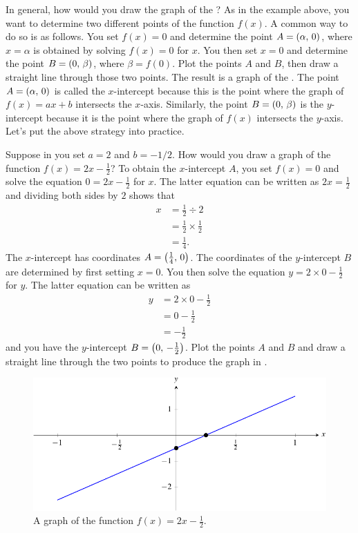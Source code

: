 \documentclass[a4paper,oneside,12pt]{article}
\begin{document}
In general, how would you draw the graph of the
?  As in the example above, you
want to determine two different points of the function $f(x)$.  A
common way to do so is as follows.  You set $f(x) = 0$ and determine
the point $A = \left\lparen{\alpha},\, {0}\right\rparen$, where $x = \alpha$ is obtained by
solving $f(x) = 0$ for $x$.  You then set $x = 0$ and determine the
point $B = \left\lparen{0},\, {\beta}\right\rparen$, where $\beta = f(0)$.  Plot the points
$A$ and $B$, then draw a straight line through those two points.  The
result is a graph of the .  The
point $A = \left\lparen{\alpha},\, {0}\right\rparen$ is called the $x$-intercept because this
is the point where the graph of $f(x) = ax + b$ intersects the
$x$-axis.  Similarly, the point $B = \left\lparen{0},\, {\beta}\right\rparen$ is the
$y$-intercept because it is the point where the graph of $f(x)$
intersects the $y$-axis.  Let's put the above strategy into practice.

Suppose in  you set $a = 2$ and
$b = -1 / 2$.  How would you draw a graph of the function
$f(x) = 2x - \frac{1}{2}$?  To obtain the $x$-intercept $A$, you set
$f(x) = 0$ and solve the equation $0 = 2x - \frac{1}{2}$ for $x$.  The
latter equation can be written as $2x = \frac{1}{2}$ and dividing both
sides by $2$ shows that
\begin{align*}
x
&=
\frac{1}{2} \div 2 \\[4pt]
&=
\frac{1}{2} \times \frac{1}{2} \\[4pt]
&=
\frac{1}{4}.
\end{align*}
The $x$-intercept has coordinates $A = \left\lparen{\frac{1}{4}},\, {0}\right\rparen$.  The
coordinates of the $y$-intercept $B$ are determined by first setting
$x = 0$.  You then solve the equation $y = 2 \times 0 - \frac{1}{2}$
for $y$.  The latter equation can be written as
\begin{align*}
y
&=
2 \times 0 - \frac{1}{2} \\[4pt]
&=
0 - \frac{1}{2} \\[4pt]
&=
-\frac{1}{2}
\end{align*}
and you have the $y$-intercept $B = \left\lparen{0},\, {-\frac{1}{2}}\right\rparen$.  Plot
the points $A$ and $B$ and draw a straight line through the two points
to produce the graph in .

\begin{figure}[!htbp]
\centering
\includegraphics[scale=1]{image/06/a-2-b-minus-half.pdf}
\caption{%
  A graph of the function $f(x) = 2x - \frac{1}{2}$.
}
\label{fig:plot_2x_minus_half}
\end{figure}
\end{document}
